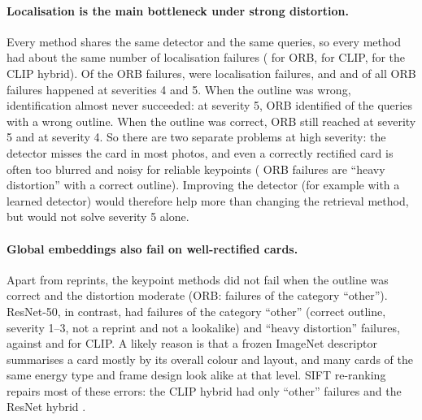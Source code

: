 \paragraph{Localisation is the main bottleneck under strong distortion.} Every method shares the same detector and the same queries, so every method had about the same number of localisation failures ( for ORB,  for CLIP,  for the CLIP hybrid). Of the  ORB failures,  were localisation failures, and  and  of all ORB failures happened at severities 4 and 5. When the outline was wrong, identification almost never succeeded: at severity 5, ORB identified  of the  queries with a wrong outline. When the outline was correct, ORB still reached  at severity 5 and  at severity 4. So there are two separate problems at high severity: the detector misses the card in most photos, and even a correctly rectified card is often too blurred and noisy for reliable keypoints ( ORB failures are ``heavy distortion'' with a correct outline). Improving the detector (for example with a learned detector) would therefore help more than changing the retrieval method, but would not solve severity 5 alone.

\paragraph{Global embeddings also fail on well-rectified cards.} Apart from reprints, the keypoint methods did not fail when the outline was correct and the distortion moderate (ORB:  failures of the category ``other''). ResNet-50, in contrast, had  failures of the category ``other'' (correct outline, severity 1--3, not a reprint and not a lookalike) and  ``heavy distortion'' failures, against  and  for CLIP. A likely reason is that a frozen ImageNet descriptor summarises a card mostly by its overall colour and layout, and many cards of the same energy type and frame design look alike at that level. SIFT re-ranking repairs most of these errors: the CLIP hybrid had only  ``other'' failures and the ResNet hybrid .

